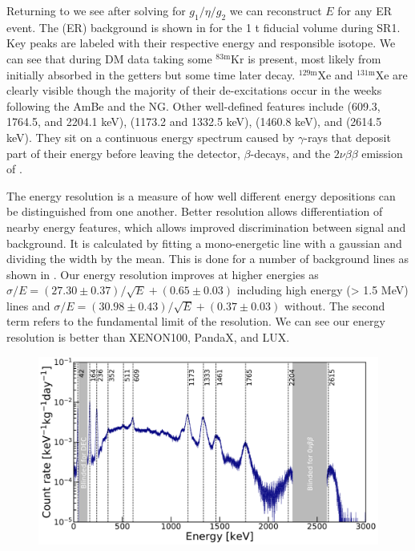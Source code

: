 {Returning to  we see after solving for $g_1/\eta/g_2$ we can reconstruct $E$ for any ER event.  The (ER)
background is shown in  for the 1 t fiducial volume during SR1.  Key peaks are
labeled with their respective energy and responsible isotope.  We can see that during DM data taking some $\mathrm{^{83m}Kr}$ is present, most
likely from  initially absorbed in the getters but some time later decay.  $\mathrm{^{129m}Xe}$ and $\mathrm{^{131m}Xe}$ are clearly
visible though the majority of their de-excitations occur in the weeks following the AmBe and the NG.  Other well-defined features
include  (609.3, 1764.5, and 2204.1 keV),  (1173.2 and 1332.5 keV),  (1460.8 keV), and 
(2614.5 keV).  They sit on a continuous energy spectrum caused by $\gamma$-rays that deposit part of their energy before leaving the
detector, $\beta$-decays, and the $2 \nu \beta \beta$ emission of .

The energy resolution is a measure of how well different energy depositions can be distinguished from one another.  Better resolution
allows differentiation of nearby energy features, which allows improved discrimination between signal and background.  It is calculated
by fitting a mono-energetic \gammaray line with a gaussian and dividing the width by the mean.  This is done for a number of background
lines as shown in .  Our energy resolution improves at higher energies
as $\sigma / E = (27.30 \pm 0.37) / \sqrt{E} + (0.65 \pm 0.03)$ including high energy (> 1.5 MeV) lines and
$\sigma / E = (30.98 \pm 0.43) / \sqrt{E} + (0.37 \pm 0.03)$ without.  The second term refers to the fundamental limit of the
resolution.  We can see our energy resolution is better than XENON100, PandaX, and LUX.

\begin{figure}
\centering
\includegraphics[width=\textwidth]{EnergySpectrum}
\label{fig:calibrations_photon_charge_efficiences_ces}
\end{figure}

}
